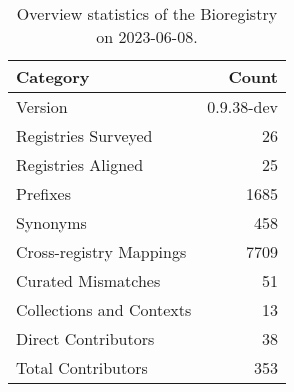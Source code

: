 \begin{table}
\caption{Overview statistics of the Bioregistry on 2023-06-08.}
\label{tab:bioregistry-summary}
\begin{tabular}{lr}
\toprule
Category & Count \\
\midrule
Version & 0.9.38-dev \\
Registries Surveyed & 26 \\
Registries Aligned & 25 \\
Prefixes & 1685 \\
Synonyms & 458 \\
Cross-registry Mappings & 7709 \\
Curated Mismatches & 51 \\
Collections and Contexts & 13 \\
Direct Contributors & 38 \\
Total Contributors & 353 \\
\bottomrule
\end{tabular}
\end{table}
